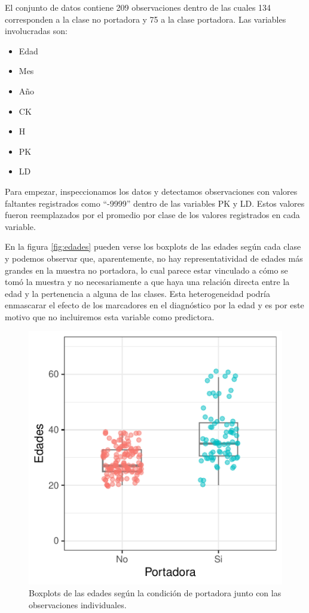 \documentclass[
]{article}
\providecommand{\tightlist}{%
  \setlength{\itemsep}{0pt}\setlength{\parskip}{0pt}}
\begin{document}
El conjunto de datos contiene 209 observaciones dentro de las cuales 134
corresponden a la clase no portadora y 75 a la clase portadora. Las
variables involucradas son:

\begin{itemize}
\tightlist
\item
  Edad
\item
  Mes
\item
  Año
\item
  CK
\item
  H
\item
  PK
\item
  LD
\end{itemize}

Para empezar, inspeccionamos los datos y detectamos observaciones con
valores faltantes registrados como ``-9999'' dentro de las variables PK
y LD. Estos valores fueron reemplazados por el promedio por clase de los
valores registrados en cada variable.

En la figura \ref{fig:edades} pueden verse los boxplots de las edades
según cada clase y podemos observar que, aparentemente, no hay
representatividad de edades más grandes en la muestra no portadora, lo
cual parece estar vinculado a cómo se tomó la muestra y no
necesariamente a que haya una relación directa entre la edad y la
pertenencia a alguna de las clases. Esta heterogeneidad podría
enmascarar el efecto de los marcadores en el diagnóstico por la edad y
es por este motivo que no incluiremos esta variable como predictora.

\begin{figure}[H]

{\centering \includegraphics{Charaf-Spiousas_Clasificacion0_files/figure-latex/unnamed-chunk-2-1} 

}

\caption{\label{fig:edades}Boxplots de las edades según la condición de portadora junto con las observaciones individuales.}\label{fig:unnamed-chunk-2}
\end{figure}
\end{document}
